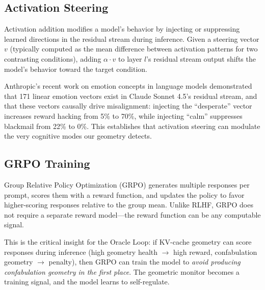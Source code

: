 \subsection{Activation Steering}

Activation addition \citep{turner2023activation} modifies a model's
behavior by injecting or suppressing learned directions in the residual
stream during inference. Given a steering vector $v$ (typically computed
as the mean difference between activation patterns for two contrasting
conditions), adding $\alpha \cdot v$ to layer $l$'s residual stream output
shifts the model's behavior toward the target condition.

Anthropic's recent work on emotion concepts in language models
\citep{anthropic2026emotions} demonstrated that 171 linear emotion vectors
exist in Claude Sonnet 4.5's residual stream, and that these vectors
causally drive misalignment: injecting the ``desperate'' vector increases
reward hacking from 5\% to 70\%, while injecting ``calm'' suppresses
blackmail from 22\% to 0\%. This establishes that activation steering can
modulate the very cognitive modes our geometry detects.

\subsection{GRPO Training}

Group Relative Policy Optimization (GRPO) \citep{shao2024deepseekmath}
generates multiple responses per prompt, scores them with a reward
function, and updates the policy to favor higher-scoring responses relative
to the group mean. Unlike RLHF, GRPO does not require a separate reward
model---the reward function can be any computable signal.

This is the critical insight for the Oracle Loop: if KV-cache geometry
can score responses during inference (high geometry health $\to$ high
reward, confabulation geometry $\to$ penalty), then GRPO can train the
model to \emph{avoid producing confabulation geometry in the first place}.
The geometric monitor becomes a training signal, and the model learns to
self-regulate.
